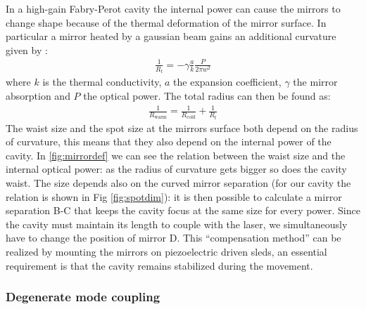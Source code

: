 In a high-gain Fabry-Perot cavity the internal power can cause the mirrors to change shape because of the thermal deformation of the mirror surface. In particular a mirror heated by a gaussian beam gains an additional curvature given by \parencite{Winkler1991}:
\begin{align}
\frac{1}{R_t} = -\gamma \frac{a}{k} \frac{P}{2\pi w^2}
\end{align}
where $k$ is the thermal conductivity, $a$ the expansion coefficient, $\gamma$ the mirror absorption and $P$ the optical power.
The total radius can then be found as:
\begin{align}
	\frac{1}{R_\mathrm{warm}} = \frac{1}{R_\mathrm{cold}} +  \frac{1}{R_t}
\end{align}
The waist size and the spot size at the mirrors surface both depend on the radius of curvature, this means that they also depend on the internal power of the cavity. In \ref{fig:mirrordef} we can see the relation between the waist size and the internal optical power: as the radius of curvature gets bigger so does the cavity waist. The size depends also on the curved mirror separation (for our cavity the relation is shown in Fig \ref{fig:spotdim}): it is then possible to calculate a mirror separation B-C that keeps the cavity focus at the same size for every power. Since the cavity must maintain its length to couple with the laser, we simultaneously have to change the position of mirror D. This ``compensation method'' can be realized by mounting the mirrors on piezoelectric driven sleds, an essential requirement is that the cavity remains stabilized during the movement.

\subsubsection{Degenerate mode coupling}

